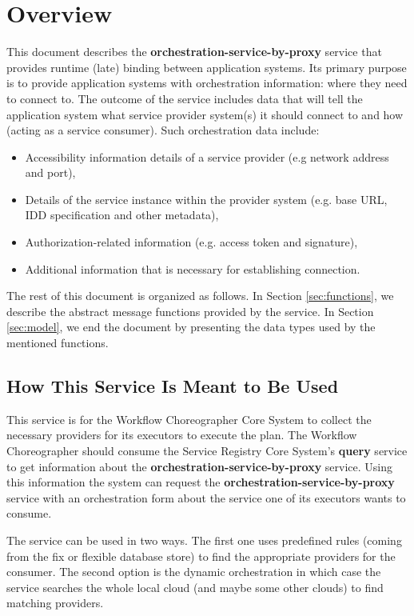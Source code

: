 \documentclass[a4paper]{arrowhead}
\begin{document}
\section{Overview}
\label{sec:overview}
This document describes the \textbf{orchestration-service-by-proxy} service that provides runtime (late) binding between application systems. Its primary purpose is to provide application systems with orchestration information: where they need to connect to. The outcome of the service includes data that will tell the application system what service provider system(s) it should connect to and how (acting as a service consumer). Such orchestration data include:

\begin{itemize}
    \item Accessibility information details of a service provider (e.g network address and port),
    \item Details of the service instance within the provider system (e.g. base URL, IDD specification and other metadata),
    \item Authorization-related information (e.g. access token and signature),
    \item Additional information that is necessary for establishing connection.
\end{itemize}

The rest of this document is organized as follows.
In Section \ref{sec:functions}, we describe the abstract message functions provided by the service.
In Section \ref{sec:model}, we end the document by presenting the data types used by the mentioned functions.

\newpage

\subsection{How This Service Is Meant to Be Used}
This service is for the Workflow Choreographer Core System to collect the necessary providers for its executors to execute the plan. The Workflow Choreographer should consume the Service Registry Core System's \textbf{query} service to get information about the \textbf{orchestration-service-by-proxy} service. Using this information the system can request the \textbf{orchestration-service-by-proxy} service with an orchestration form about the service one of its executors wants to consume. 

The service can be used in two ways. The first one uses predefined rules (coming from the fix or flexible database store) to find the appropriate providers for the consumer. The second option is the dynamic orchestration in which case the service searches the whole local cloud (and maybe some other clouds) to find matching providers.
\end{document}
